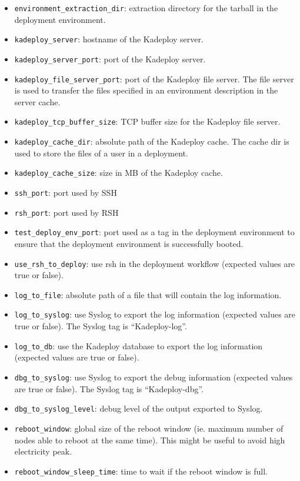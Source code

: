 \documentclass[a4wide,10pt,oneside]{book}
\begin{document}
\begin{itemize}
\item \texttt{environment\_extraction\_dir}: extraction directory for the tarball in the deployment environment.
\item \texttt{kadeploy\_server}: hostname of the Kadeploy server.
\item \texttt{kadeploy\_server\_port}: port of the Kadeploy server.
\item \texttt{kadeploy\_file\_server\_port}: port of the Kadeploy file server. The file server is used to transfer the files specified in an environment description in the server cache.
\item \texttt{kadeploy\_tcp\_buffer\_size}: TCP buffer size for the Kadeploy file server.
\item \texttt{kadeploy\_cache\_dir}: absolute path of the Kadeploy cache. The cache dir is used to store the files of a user in a deployment.
\item \texttt{kadeploy\_cache\_size}: size in MB of the Kadeploy cache.
\item \texttt{ssh\_port}: port used by SSH
\item \texttt{rsh\_port}: port used by RSH
\item \texttt{test\_deploy\_env\_port}: port used as a tag in the deployment environment to ensure that the deployment environment is successfully booted.
\item \texttt{use\_rsh\_to\_deploy}: use rsh in the deployment workflow (expected values are true or false).
\item \texttt{log\_to\_file}: absolute path of a file that will contain the log information.
\item \texttt{log\_to\_syslog}: use Syslog to export the log information (expected values are true or false). The Syslog tag is ``Kadeploy-log''.
\item \texttt{log\_to\_db}: use the Kadeploy database to export the log information (expected values are true or false).
\item \texttt{dbg\_to\_syslog}: use Syslog to export the debug information (expected values are true or false). The Syslog tag is ``Kadeploy-dbg''.
\item \texttt{dbg\_to\_syslog\_level}: debug level of the output exported to Syslog.
\item \texttt{reboot\_window}: global size of the reboot window (ie. maximum number of nodes able to reboot at the same time). This might be useful to avoid high electricity peak.
\item \texttt{reboot\_window\_sleep\_time}: time to wait if the reboot window is full.

\end{itemize}
\end{document}
